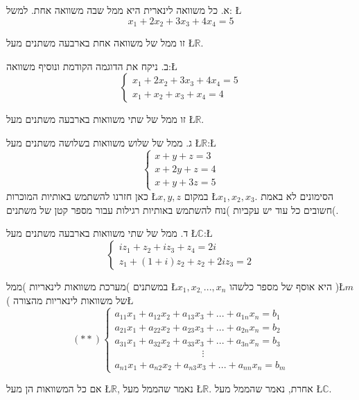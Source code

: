 \begin{examples}
א. כל משוואה לינארית היא ממ\textquotedbl ל שבה משוואה אחת.
למשל: \L{%
\[
x_{1}+2x_{2}+3x_{3}+4x_{4}=5
\]
}%

זו ממ\textquotedbl ל של משוואה אחת בארבעה משתנים מעל \L{$\mathbb{R}$}. 

ב. ניקח את הדוגמה הקודמת ונוסיף משוואה:\L{%
\[
\begin{cases}
x_{1}+2x_{2}+3x_{3}+4x_{4}=5\\
x_{1}+x_{2}+x_{3}+x_{4}=4
\end{cases}
\]
}%

זו ממ\textquotedbl ל של שתי משוואות בארבעה משתנים מעל \L{$\mathbb{R}$}. 

ג. ממ\textquotedbl ל של שלוש משוואות בשלושה משתנים מעל \L{$\mathbb{\mathbb{R}}$}:\L{%
\[
\begin{cases}
x+y+z=3\\
x+2y+z=4\\
x+y+3z=5
\end{cases}
\]
}%
כאן חזרנו להשתמש באותיות המוכרות \L{$x,y,z$} במקום \L{$x_{1},x_{2},x_{3}$}.
הסימונים לא באמת חשובים כל עוד יש עקביות )נוח להשתמש באותיות רגילות
עבור מספר קטן של משתנים(. 

ד. ממ\textquotedbl ל של שתי משוואות בארבעה משתנים מעל \L{$\mathbb{C}$}:\L{%
\[
\begin{cases}
iz_{1}+z_{2}+iz_{3}+z_{4}=2i\\
z_{1}+(1+i)z_{2}+z_{2}+2iz_{3}=2
\end{cases}
\]
}%
\end{examples}

\begin{hdef}
מערכת משוואות לינאריות )ממ\textquotedbl ל( במשתנים \L{$x_{1},x_{2,}...,x_{n}$}
היא אוסף של מספר כלשהו )\L{$m$}( של משוואות לינאריות מהצורה\L{%
\[
(**)\begin{cases}
a_{11}x_{1}+a_{12}x_{2}+a_{13}x_{3}+...+a_{1n}x_{n}=b_{1}\\
a_{21}x_{1}+a_{22}x_{2}+a_{23}x_{3}+...+a_{2n}x_{n}=b_{2}\\
a_{31}x_{1}+a_{32}x_{2}+a_{33}x_{3}+...+a_{3n}x_{n}=b_{3}\\
\qquad\qquad\qquad\qquad\quad\vdots\\
a_{n1}x_{1}+a_{n2}x_{2}+a_{n3}x_{3}+...+a_{nn}x_{n}=b_{m}
\end{cases}
\]
}%

אם כל המשוואות הן מעל \L{$\mathbb{R}$}, נאמר שהממ\textquotedbl ל
מעל \L{$\mathbb{R}$}. אחרת, נאמר שהממ\textquotedbl ל מעל \L{$\mathbb{C}$}.
\end{hdef}

